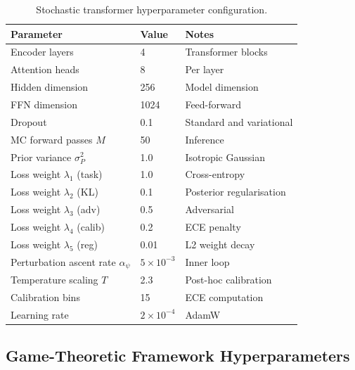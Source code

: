 \begin{table}[htbp]
\centering
\caption{Stochastic transformer hyperparameter configuration.}
\label{tab:hp_stochastic}
\begin{tabular}{lll}
\toprule
Parameter & Value & Notes \\
\midrule
Encoder layers             & 4     & Transformer blocks \\
Attention heads            & 8     & Per layer \\
Hidden dimension           & 256   & Model dimension \\
FFN dimension              & 1024  & Feed-forward \\
Dropout                    & 0.1   & Standard and variational \\
MC forward passes $M$      & 50    & Inference \\
Prior variance $\sigma_P^2$ & 1.0  & Isotropic Gaussian \\
Loss weight $\lambda_1$ (task) & 1.0 & Cross-entropy \\
Loss weight $\lambda_2$ (KL)  & 0.1 & Posterior regularisation \\
Loss weight $\lambda_3$ (adv) & 0.5 & Adversarial \\
Loss weight $\lambda_4$ (calib) & 0.2 & ECE penalty \\
Loss weight $\lambda_5$ (reg)  & 0.01 & L2 weight decay \\
Perturbation ascent rate $\alpha_\psi$ & $5\times10^{-3}$ & Inner loop \\
Temperature scaling $T$    & 2.3   & Post-hoc calibration \\
Calibration bins           & 15    & ECE computation \\
Learning rate              & $2\times10^{-4}$ & AdamW \\
\bottomrule
\end{tabular}
\end{table}


\subsection{Game-Theoretic Framework Hyperparameters}
\label{app:hp_game}

